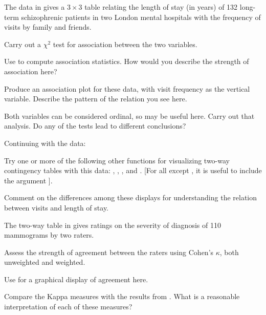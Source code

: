 \documentclass[11pt]{report}\usepackage[]{graphicx}\usepackage[]{color}
\begin{document}
\begin{Exercises}
  \exercise The  data in  gives a $3 \times 3$ table
  relating the length of stay (in years) of 132 long-term schizophrenic patients in two London mental hospitals with the frequency of visits
  by family and friends.
    \begin{enumerate*}
      \item Carry out a  $\chi^2$ test for association between the two
      variables.
      \item Use  to compute association statistics.
      How would you describe the strength of association here?
      \item Produce an association plot for these data, with
      visit frequency as the vertical variable.  Describe the
      pattern of the relation you see here.
      \item Both variables can be considered ordinal, so
       may be useful here.  Carry out that
      analysis.  Do any of the tests lead to different conclusions?
    \end{enumerate*}

  \exercise Continuing with the  data:
    \begin{enumerate*}
      \item Try one or more of the following other functions for visualizing two-way contingency tables with this data: 
      , , , and .  
      [For all except , it is useful to include the argument ].
      \item Comment on the differences among these displays for understanding the relation between visits and length of stay.
    \end{enumerate*}
  
  \exercise The two-way table  in  gives ratings
  on the severity of diagnosis of 110 mammograms by two raters.
    \begin{enumerate*}
      \item Assess the strength of agreement between the raters using Cohen's
      $\kappa$, both unweighted and weighted.
      \item Use  for a graphical display of agreement here.
      \item Compare the Kappa measures with the results from . 
      What is a reasonable interpretation of each of these measures?
    \end{enumerate*}


\end{Exercises}
\end{document}
